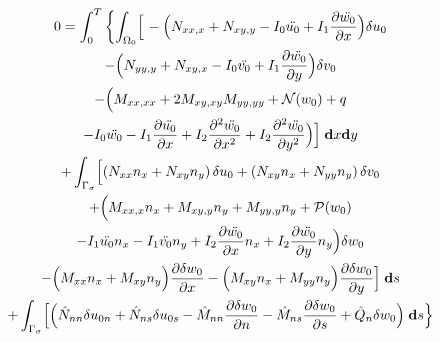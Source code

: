 \documentclass[11pt,letterpaper,titlepage,draft]{article}
\newcommand{\diff}{\textbf d}
\newcommand{\PDer}[2]{\frac{\partial #1}{\partial #2}}
\newcommand{\PPDer}[2]{\frac{\partial^2 #1}{\partial #2^2}}
\newcommand{\Vartn}[1]{\delta #1}
\numberwithin{equation}{subsection}
\begin{document}
\begin{multline}\label{E:S1001:SS102:17}
        0=\int_0^T\left\{\int_{\Omega_0} \Bigl[\right.
                                        - \Bigl( N_{xx,x} + N_{xy,y} - I_0 \ddot{u_0} + I_1 \PDer{\ddot{w_0}}{x} \Bigr) \Vartn{u_0} 
\\
                                        - \Bigl( N_{yy,y} + N_{xy,x} - I_0 \ddot{v_0} + I_1 \PDer{\ddot{w_0}}{y} \Bigr) \Vartn{v_0} 
\\
                                        - \Bigl(\Bigr. M_{xx,xx} + 2M_{xy,xy} M_{yy,yy} + \mathcal{N}(w_0)  + q 
\\
\Bigl.                                  -I_0\ddot{w_0} - I_1\PDer{\ddot{u_0}}{x} + I_2\PPDer{\ddot{w_0}}{x} + I_2\PPDer{\ddot{w_0}}{y} \Bigr)
\Bigl. \Bigr]\; \diff{x}\diff{y}
\\
+ \int_{\Gamma_{\sigma}} \Bigl[
                                       \left( N_{xx} n_x + N_{xy} n_y \right) \Vartn{u_0}
                                       + \left( N_{xy} n_x + N_{yy} n_y \right) \Vartn{v_0}
\\
                                       + \Bigl( \Bigr. M_{xx,x} n_x + M_{xy,y} n_y + M_{yy,y} n_y + \mathcal{P}(w_0)
\\
                                       - I_1\ddot{u_0}n_x  - I_1\ddot{v_0} n_y + I_2 \PDer{\ddot{w_0}}{x} n_x + I_2 \PDer{\ddot{w_0}}{y} n_y \Bigl. \Bigr) \Vartn{w_0}
\\
                                      -\Bigl( M_{xx} n_x + M_{xy} n_y \Bigr)\PDer{\Vartn{w_0}}{x} - \Bigl( M_{xy} n_x + M_{yy} n_y \Bigr)\PDer{\Vartn{w_0}}{y}
\Bigr] \; \diff{s}
\\
%
+ \int_{\Gamma_{\sigma}} \Bigl[
                                      \Bigl( \hat{N}_{nn} \Vartn{u_{0n}} + \hat{N}_{ns} \Vartn{u_{0s}} 
                                      - \hat{M}_{nn} \PDer{\Vartn{w_0}}{n} - \hat{M}_{ns} \PDer{\Vartn{w_0}}{s} + \hat{Q}_{n} \Vartn{w_0} \Bigr)\; \diff{s}
\Bigl.\Bigr\}
\end{multline}


\end{document}
